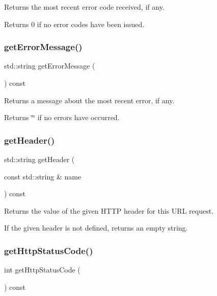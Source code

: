 Returns the most recent error code received, if any. 

Returns 0 if no error codes have been issued. \mbox{\label{classiurlstream_adf0cc934eff26878cdf2018259997a4a}} 
\subsubsection{\texorpdfstring{get\+Error\+Message()}{getErrorMessage()}}
{\footnotesize\ttfamily std\+::string get\+Error\+Message (\begin{DoxyParamCaption}{ }\end{DoxyParamCaption}) const}



Returns a message about the most recent error, if any. 

Returns \char`\"{}\char`\"{} if no errors have occurred. \mbox{\label{classiurlstream_a736d777b29179f52ba753317d84b1087}} 
\subsubsection{\texorpdfstring{get\+Header()}{getHeader()}}
{\footnotesize\ttfamily std\+::string get\+Header (\begin{DoxyParamCaption}\item[{const std\+::string \&}]{name }\end{DoxyParamCaption}) const}



Returns the value of the given H\+T\+TP header for this U\+RL request. 

If the given header is not defined, returns an empty string. \mbox{\label{classiurlstream_ab6c069ef77f1319830dcfd90eed6a2ce}} 
\subsubsection{\texorpdfstring{get\+Http\+Status\+Code()}{getHttpStatusCode()}}
{\footnotesize\ttfamily int get\+Http\+Status\+Code (\begin{DoxyParamCaption}{ }\end{DoxyParamCaption}) const}



